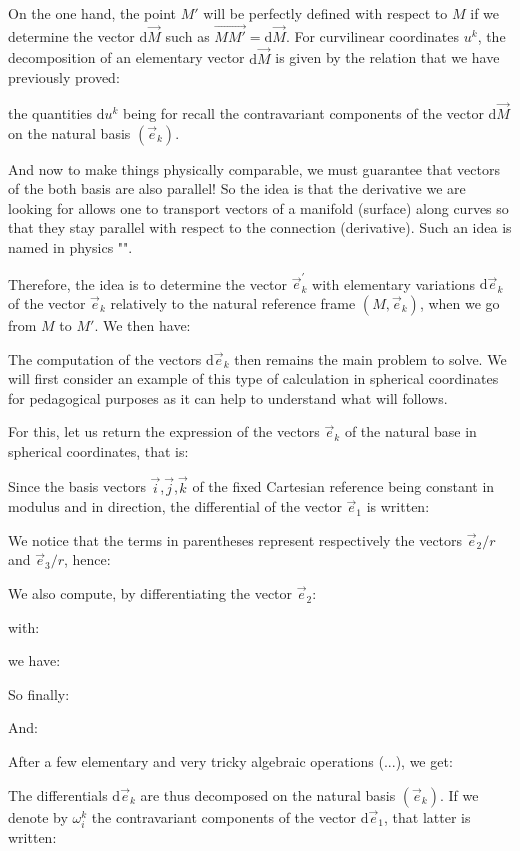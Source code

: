 	On the one hand, the point $M'$ will be perfectly defined with respect to $M$ if we determine the vector $\mathrm{d}\vec{M}$ such as $\overrightarrow{MM'}=\mathrm{d}\vec{M}$. For curvilinear coordinates $u^k$, the decomposition of an elementary vector $\mathrm{d}\vec{M}$ is given by the relation that we have previously proved:
	
	the quantities $\mathrm{d}u^k$ being for recall the contravariant components of the vector $\mathrm{d}\vec{M}$ on the natural basis $(\vec{e}_k)$.
	
	And now to make things physically comparable, we must guarantee that vectors of the both basis are also parallel! So the idea is that the derivative we are looking for allows one to transport vectors of a manifold (surface) along curves so that they stay parallel with respect to the connection (derivative). Such an idea is named in physics "".

	Therefore, the idea is to determine the vector $\vec{e}_k^{'}$ with elementary variations $\mathrm{d}\vec{e}_k$ of the vector $\vec{e}_k$ relatively to the natural reference frame $(M,\vec{e}_k)$, when we go from $M$ to $M'$. We then have:
	
	The computation of the vectors $\mathrm{d}\vec{e}_k$ then remains the main problem to solve. We will first consider an example of this type of calculation in spherical coordinates for pedagogical purposes as it can help to understand what will follows.

For this, let us return the expression of the vectors $\vec{e}_k$ of the natural base in spherical coordinates, that is:
	
	Since the basis vectors $\vec{i}$,$\vec{j}$,$\vec{k}$ of the fixed Cartesian reference being constant in modulus and in direction, the differential of the vector $\vec{e}_1$ is written:
	
	We notice that the terms in parentheses represent respectively the vectors $\vec{e}_2/r$ and $\vec{e}_3/r$, hence:
	
	We also compute, by differentiating the vector $\vec{e}_2$:
	
	with:
	
	we have:
	
	So finally:
	
	And:
	
	After a few elementary and very tricky algebraic operations (...), we get:
	
	The differentials $\mathrm{d}\vec{e}_k$ are thus decomposed on the natural basis $(\vec{e}_k)$. If we denote by $\omega_i^k$ the contravariant components of the vector $\mathrm{d}\vec{e}_1$, that latter is written:
	
